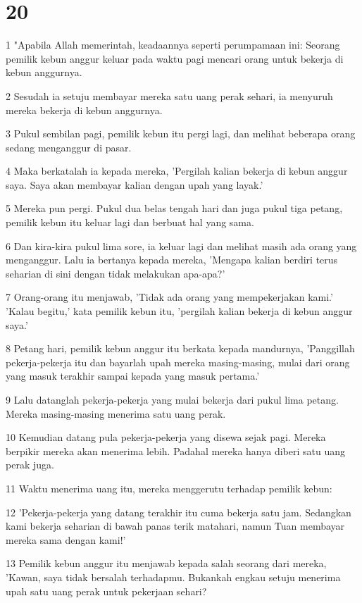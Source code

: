 \chapter{20}

\par 1 "Apabila Allah memerintah, keadaannya seperti perumpamaan ini: Seorang pemilik kebun anggur keluar pada waktu pagi mencari orang untuk bekerja di kebun anggurnya.
\par 2 Sesudah ia setuju membayar mereka satu uang perak sehari, ia menyuruh mereka bekerja di kebun anggurnya.
\par 3 Pukul sembilan pagi, pemilik kebun itu pergi lagi, dan melihat beberapa orang sedang menganggur di pasar.
\par 4 Maka berkatalah ia kepada mereka, 'Pergilah kalian bekerja di kebun anggur saya. Saya akan membayar kalian dengan upah yang layak.'
\par 5 Mereka pun pergi. Pukul dua belas tengah hari dan juga pukul tiga petang, pemilik kebun itu keluar lagi dan berbuat hal yang sama.
\par 6 Dan kira-kira pukul lima sore, ia keluar lagi dan melihat masih ada orang yang menganggur. Lalu ia bertanya kepada mereka, 'Mengapa kalian berdiri terus seharian di sini dengan tidak melakukan apa-apa?'
\par 7 Orang-orang itu menjawab, 'Tidak ada orang yang mempekerjakan kami.' 'Kalau begitu,' kata pemilik kebun itu, 'pergilah kalian bekerja di kebun anggur saya.'
\par 8 Petang hari, pemilik kebun anggur itu berkata kepada mandurnya, 'Panggillah pekerja-pekerja itu dan bayarlah upah mereka masing-masing, mulai dari orang yang masuk terakhir sampai kepada yang masuk pertama.'
\par 9 Lalu datanglah pekerja-pekerja yang mulai bekerja dari pukul lima petang. Mereka masing-masing menerima satu uang perak.
\par 10 Kemudian datang pula pekerja-pekerja yang disewa sejak pagi. Mereka berpikir mereka akan menerima lebih. Padahal mereka hanya diberi satu uang perak juga.
\par 11 Waktu menerima uang itu, mereka menggerutu terhadap pemilik kebun:
\par 12 'Pekerja-pekerja yang datang terakhir itu cuma bekerja satu jam. Sedangkan kami bekerja seharian di bawah panas terik matahari, namun Tuan membayar mereka sama dengan kami!'
\par 13 Pemilik kebun anggur itu menjawab kepada salah seorang dari mereka, 'Kawan, saya tidak bersalah terhadapmu. Bukankah engkau setuju menerima upah satu uang perak untuk pekerjaan sehari?
